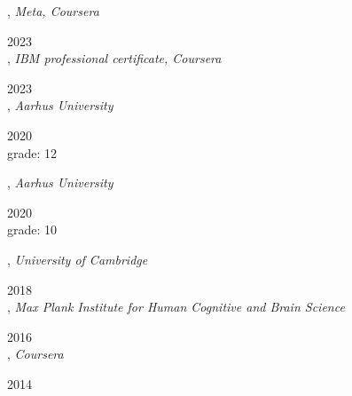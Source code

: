 

,
\textit{Meta, Coursera}\strut \hfill 2023\\

,
\textit{IBM professional certificate, Coursera}\strut \hfill 2023\\

,
\textit{Aarhus University}\strut \hfill 2020\\
grade: 12

,
\textit{Aarhus University}\strut \hfill 2020\\
grade: 10

,
\textit{University of Cambridge}\strut \hfill 2018\\

,
\textit{Max Plank Institute for Human Cognitive and Brain Science}\strut \hfill 2016\\

,
\textit{Coursera}\strut \hfill 2014\\

